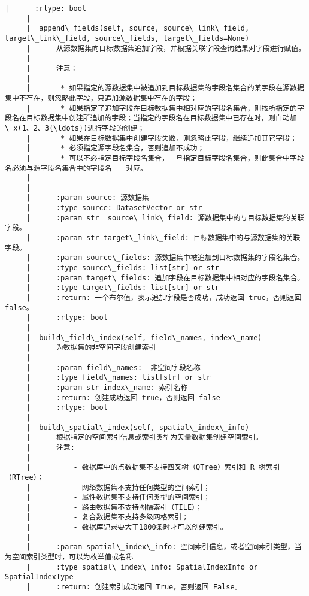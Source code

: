 \documentclass[11pt]{article}
\begin{document}
\begin{Verbatim}[commandchars=\\\{\}]
     |      :rtype: bool
     |  
     |  append\_fields(self, source, source\_link\_field, target\_link\_field, source\_fields, target\_fields=None)
     |      从源数据集向目标数据集追加字段，并根据关联字段查询结果对字段进行赋值。
     |      
     |      注意：
     |      
     |       * 如果指定的源数据集中被追加到目标数据集的字段名集合的某字段在源数据集中不存在，则忽略此字段，只追加源数据集中存在的字段；
     |       * 如果指定了追加字段在目标数据集中相对应的字段名集合，则按所指定的字段名在目标数据集中创建所追加的字段；当指定的字段名在目标数据集中已存在时，则自动加\_x(1、2、3{\ldots})进行字段的创建；
     |       * 如果在目标数据集中创建字段失败，则忽略此字段，继续追加其它字段；
     |       * 必须指定源字段名集合，否则追加不成功；
     |       * 可以不必指定目标字段名集合，一旦指定目标字段名集合，则此集合中字段名必须与源字段名集合中的字段名一一对应。
     |      
     |      
     |      :param source: 源数据集
     |      :type source: DatasetVector or str
     |      :param str  source\_link\_field: 源数据集中的与目标数据集的关联字段。
     |      :param str target\_link\_field: 目标数据集中的与源数据集的关联字段。
     |      :param source\_fields: 源数据集中被追加到目标数据集的字段名集合。
     |      :type source\_fields: list[str] or str
     |      :param target\_fields: 追加字段在目标数据集中相对应的字段名集合。
     |      :type target\_fields: list[str] or str
     |      :return: 一个布尔值，表示追加字段是否成功，成功返回 true，否则返回 false。
     |      :rtype: bool
     |  
     |  build\_field\_index(self, field\_names, index\_name)
     |      为数据集的非空间字段创建索引
     |      
     |      :param field\_names:  非空间字段名称
     |      :type field\_names: list[str] or str
     |      :param str index\_name: 索引名称
     |      :return: 创建成功返回 true，否则返回 false
     |      :rtype: bool
     |  
     |  build\_spatial\_index(self, spatial\_index\_info)
     |      根据指定的空间索引信息或索引类型为矢量数据集创建空间索引。
     |      注意:
     |      
     |          - 数据库中的点数据集不支持四叉树（QTree）索引和 R 树索引（RTree）；
     |          - 网络数据集不支持任何类型的空间索引；
     |          - 属性数据集不支持任何类型的空间索引；
     |          - 路由数据集不支持图幅索引（TILE）；
     |          - 复合数据集不支持多级网格索引；
     |          - 数据库记录要大于1000条时才可以创建索引。
     |      
     |      :param spatial\_index\_info: 空间索引信息，或者空间索引类型，当为空间索引类型时，可以为枚举值或名称
     |      :type spatial\_index\_info: SpatialIndexInfo or SpatialIndexType
     |      :return: 创建索引成功返回 True，否则返回 False。

\end{Verbatim}
\end{document}
